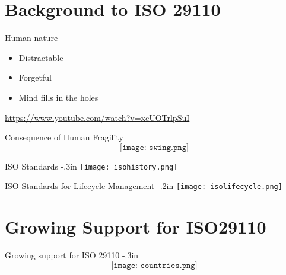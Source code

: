 %

    
\section{Background to ISO 29110}
\begin{frame}{Human nature}
\begin{itemize}
\item Distractable
\item Forgetful
\item Mind fills in the holes
\end{itemize}
\bigskip
\url{https://www.youtube.com/watch?v=xcUOTrlpSuI}
\end{frame}

\begin{frame}{Consequence of Human Fragility}
$$\texttt{[image: swing.png]}$$
\end{frame}

\begin{frame}{ISO Standards}
\kern -.3in
\texttt{[image: isohistory.png]}
\end{frame}

\begin{frame}{ISO Standards for Lifecycle Management}
\kern -.2in
\texttt{[image: isolifecycle.png]}
\end{frame}

\section{Growing Support for ISO29110}
\begin{frame}{Growing support for ISO 29110}
\kern -.3in
$$\texttt{[image: countries.png]}$$
\end{frame}


